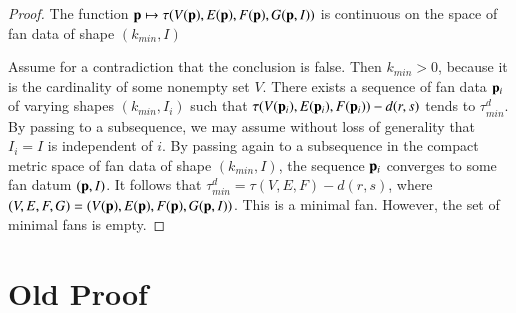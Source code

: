 \begin{proof} 
The function ${\mathbf p}\mapsto \tau(V({\mathbf p}),E({\mathbf p}),F({\mathbf p}),G({\mathbf p},I))$ is continuous on the space of fan data of shape $(k_{min},I)$

Assume for a contradiction that the conclusion is false.
Then $k_{min}>0$, because it is the cardinality of some nonempty set $V$.
There exists a sequence of fan data ${\mathbf p}_i$ of varying shapes $(k_{min},I_i)$ such that 
$\tau(V({\mathbf p}_i),E({\mathbf p}_i),F({\mathbf p}_i))-d(r,s)$ tends to $\tau^d_{min}$.  By passing to a subsequence, we may assume without loss of generality that $I_i = I$ is independent of $i$.
By passing again to a subsequence in the compact 
metric space of fan data of shape $(k_{min},I)$, the sequence ${\mathbf p}_i$ converges to some fan datum $({\mathbf p},I)$.
It follows that $\tau^d_{min} = \tau(V,E,F)-d(r,s)$, where $(V,E,F,G)=(V({\mathbf p}),E({\mathbf p}),F({\mathbf p}),G({\mathbf p},I))$.   
This is a minimal fan.
However, the set of minimal fans is empty.
\end{proof}


\section{Old Proof}


